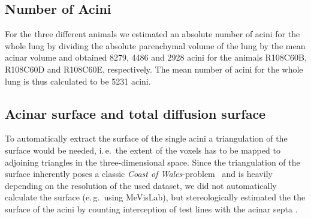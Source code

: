 \documentclass[twoside,paper=a4,abstract=true,english,DIVcalc]{scrartcl}
\newcommand{\ie}{i.\,e.\ }
\newcommand{\eg}{e.\,g.\ }
\begin{document}
\subsection{Number of Acini}

For the three different animals we estimated an absolute number of acini for the whole lung by dividing the absolute parenchymal volume of the lung by the mean acinar volume and obtained 8279, 4486 and 2928 acini for the animals R108C60B, R108C60D and R108C60E, respectively. The mean number of acini for the whole lung is thus calculated to be 5231 acini. 

\subsection{Acinar surface and total diffusion surface}

%
%
To automatically extract the surface of the single acini a triangulation of the surface would be needed, \ie the extent of the voxels has to be mapped to adjoining triangles in the three-dimensional space. Since the triangulation of the surface inherently poses a classic \emph{Coast of Wales}-problem~\cite{Mandelbrot1967a} and is heavily depending on the resolution of the used dataset, we did not automatically calculate the surface (\eg using MeVisLab), but stereologically estimated the the surface of the acini by counting interception of test lines with the acinar septa \cite{Hsia2010}.
\end{document}

